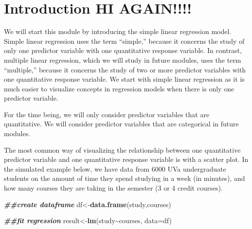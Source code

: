 \documentclass[
]{book}
\newenvironment{Shaded}{\begin{snugshade}}{\end{snugshade}}
\newcommand{\AttributeTok}[1]{\textcolor[rgb]{0.13,0.29,0.53}{#1}}
\newcommand{\DocumentationTok}[1]{\textcolor[rgb]{0.56,0.35,0.01}{\textbf{\textit{#1}}}}
\newcommand{\FunctionTok}[1]{\textcolor[rgb]{0.13,0.29,0.53}{\textbf{#1}}}
\newcommand{\NormalTok}[1]{#1}
\newcommand{\OtherTok}[1]{\textcolor[rgb]{0.56,0.35,0.01}{#1}}
\newcommand{\SpecialCharTok}[1]{\textcolor[rgb]{0.81,0.36,0.00}{\textbf{#1}}}
\newcommand{\StringTok}[1]{\textcolor[rgb]{0.31,0.60,0.02}{#1}}
\begin{document}
\section{Introduction HI AGAIN!!!!}\label{introduction-hi-again}

We will start this module by introducing the simple linear regression model. Simple linear regression uses the term ``simple,'' because it concerns the study of only one predictor variable with one quantitative response variable. In contrast, multiple linear regression, which we will study in future modules, uses the term ``multiple,'' because it concerns the study of two or more predictor variables with one quantitative response variable. We start with simple linear regression as it is much easier to visualize concepts in regression models when there is only one predictor variable.

For the time being, we will only consider predictor variables that are quantitative. We will consider predictor variables that are categorical in future modules.

The most common way of visualizing the relationship between one quantitative predictor variable and one quantitative response variable is with a scatter plot. In the simulated example below, we have data from 6000 UVa undergraduate students on the amount of time they spend studying in a week (in minutes), and how many courses they are taking in the semester (3 or 4 credit courses).

\begin{Shaded}
\begin{Highlighting}[]
\DocumentationTok{\#\#create dataframe}
\NormalTok{df}\OtherTok{\textless{}{-}}\FunctionTok{data.frame}\NormalTok{(study,courses)}

\DocumentationTok{\#\#fit regression}
\NormalTok{result}\OtherTok{\textless{}{-}}\FunctionTok{lm}\NormalTok{(study}\SpecialCharTok{\textasciitilde{}}\NormalTok{courses, }\AttributeTok{data=}\NormalTok{df)}
\end{Highlighting}
\end{Shaded}

\begin{Shaded}
\end{Shaded}
\end{document}
